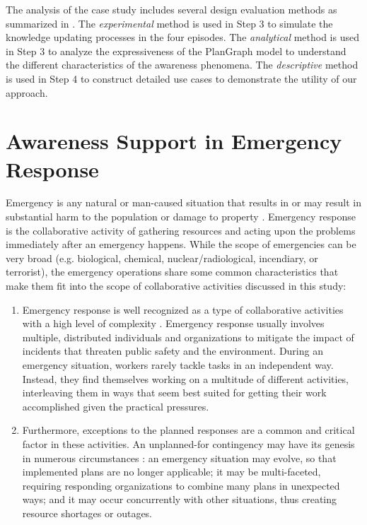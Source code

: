 The analysis of the case study includes several design evaluation methods as summarized in \cite{Hevner2004}. The \emph{experimental} method is used in Step 3 to simulate the knowledge updating processes in the four episodes. The \emph{analytical} method is used in Step 3 to analyze the expressiveness of the PlanGraph model to understand the different characteristics of the awareness phenomena. The \emph{descriptive} method is used in Step 4 to construct detailed use cases to demonstrate the utility of our approach.

\section{Awareness Support in Emergency Response} %
\label{sec:awareness_support_in_emergency_response}
Emergency is any natural or man-caused situation that results in or may result in substantial harm to the population or damage to property \cite{shen2004managing}. Emergency response is the collaborative activity of gathering resources and acting upon the problems immediately after an emergency happens. While the scope of emergencies can be very broad (e.g. biological, chemical, nuclear/radiological, incendiary, or terrorist), the emergency operations share some common characteristics that make them fit into the scope of collaborative activities discussed in this study:

\begin{enumerate}
	\item Emergency response is well recognized as a type of collaborative activities with a high level of complexity \cite{Turoff2004}. Emergency response usually involves multiple, distributed individuals and organizations to mitigate the impact of incidents that threaten public safety and the environment. During an emergency situation, workers rarely tackle tasks in an independent way. Instead, they find themselves working on a multitude of different activities, interleaving them in ways that seem best suited for getting their work accomplished given the practical pressures.
	\item Furthermore, exceptions to the planned responses are a common and critical factor in these activities. An unplanned-for contingency may have its genesis in numerous circumstances \cite{Mendonca2004}: an emergency situation may evolve, so that implemented plans are no longer applicable; it may be multi-faceted, requiring responding organizations to combine many plans in unexpected ways; and it may occur concurrently with other situations, thus creating resource shortages or outages.
\end{enumerate}

